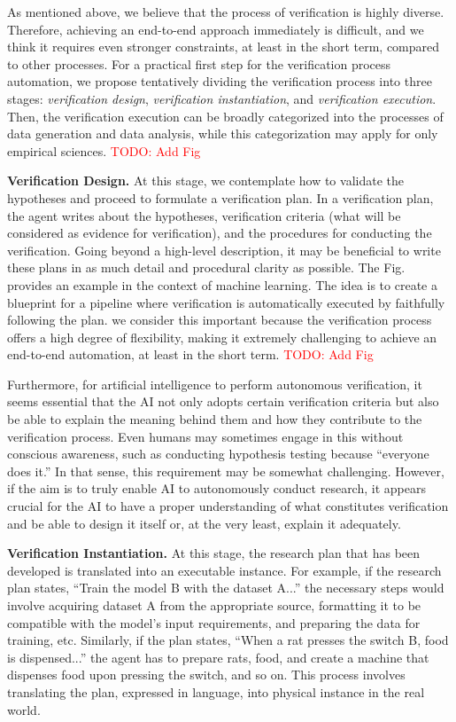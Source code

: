 \documentclass{book}
\begin{document}
As mentioned above, we believe that the process of verification is highly diverse. Therefore, achieving an end-to-end approach immediately is difficult, and we think it requires even stronger constraints, at least in the short term, compared to other processes. For a practical first step for the verification process automation, we propose tentatively dividing the verification process into three stages: \textit{verification design}, \textit{verification instantiation}, and \textit{verification execution}. Then, the verification execution can be broadly categorized into the processes of data generation and data analysis, while this categorization may apply for only empirical sciences. \textcolor{red}{TODO: Add Fig}

\textbf{Verification Design.} At this stage, we contemplate how to validate the hypotheses and proceed to formulate a verification plan. In a verification plan, the agent writes about the hypotheses, verification criteria (what will be considered as evidence for verification), and the procedures for conducting the verification. Going beyond a high-level description, it may be beneficial to write these plans in as much detail and procedural clarity as possible. The Fig. provides an example in the context of machine learning. The idea is to create a blueprint for a pipeline where verification is automatically executed by faithfully following the plan. we consider this important because the verification process offers a high degree of flexibility, making it extremely challenging to achieve an end-to-end automation, at least in the short term. \textcolor{red}{TODO: Add Fig}

Furthermore, for artificial intelligence to perform autonomous verification, it seems essential that the AI not only adopts certain verification criteria but also be able to explain the meaning behind them and how they contribute to the verification process. Even humans may sometimes engage in this without conscious awareness, such as conducting hypothesis testing because ``everyone does it.'' In that sense, this requirement may be somewhat challenging. However, if the aim is to truly enable AI to autonomously conduct research, it appears crucial for the AI to have a proper understanding of what constitutes verification and be able to design it itself or, at the very least, explain it adequately.

\textbf{Verification Instantiation.} At this stage, the research plan that has been developed is translated into an executable instance. For example, if the research plan states, ``Train the model B with the dataset A...'' the necessary steps would involve acquiring dataset A from the appropriate source, formatting it to be compatible with the model's input requirements, and preparing the data for training, etc. Similarly, if the plan states, ``When a rat presses the switch B, food is dispensed...'' the agent has to prepare rats, food, and create a machine that dispenses food upon pressing the switch, and so on. This process involves translating the plan, expressed in language, into physical instance in the real world.
\end{document}
